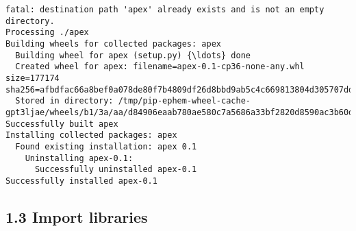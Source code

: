 \documentclass[10pt]{article}
\begin{document}
    \begin{Verbatim}[commandchars=\\\{\}]
fatal: destination path 'apex' already exists and is not an empty directory.
Processing ./apex
Building wheels for collected packages: apex
  Building wheel for apex (setup.py) {\ldots} done
  Created wheel for apex: filename=apex-0.1-cp36-none-any.whl size=177174
sha256=afbdfac66a8bef0a078de80f7b4809df26d8bbd9ab5c4c669813804d305707dd
  Stored in directory: /tmp/pip-ephem-wheel-cache-
gpt3ljae/wheels/b1/3a/aa/d84906eaab780ae580c7a5686a33bf2820d8590ac3b60d5967
Successfully built apex
Installing collected packages: apex
  Found existing installation: apex 0.1
    Uninstalling apex-0.1:
      Successfully uninstalled apex-0.1
Successfully installed apex-0.1
    \end{Verbatim}

    \hypertarget{import-libraries}{%
\subsection*{1.3 Import libraries}\label{import-libraries}}
\end{document}
